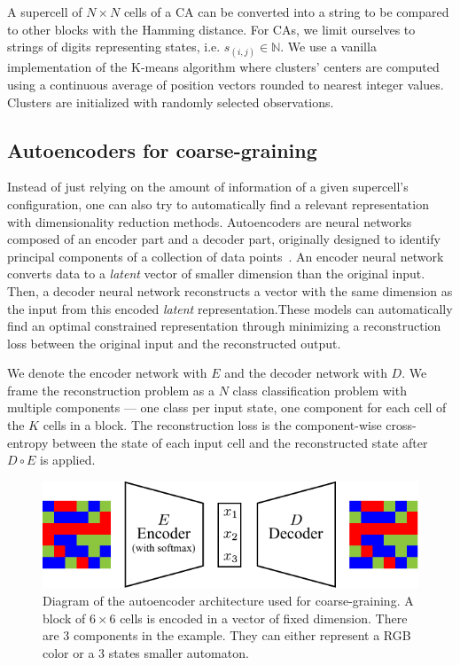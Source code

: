A supercell of $N\times N$ cells of a CA can be converted into a string to be
compared to other blocks with the Hamming distance. For CAs, we limit ourselves
to strings of digits representing states, i.e. $s_{(i,j)} \in \mathbb{N}$. We
use a vanilla implementation of the K-means algorithm where clusters' centers
are computed using a continuous average of position vectors rounded to nearest
integer values. Clusters are initialized with randomly selected observations.

\subsection{Autoencoders for coarse-graining}

Instead of just relying on the amount of information of a given supercell's
configuration, one can also try to automatically find a relevant representation
with dimensionality reduction methods. Autoencoders are neural networks composed
of an encoder part and a decoder part, originally designed to identify principal
components of a collection of data
points~\parencite{baldiNeuralNetworksPrincipal1989,
  hintonConnectionistLearningProcedures1989,
  kramerNonlinearPrincipalComponent1991}. An encoder neural network converts
data to a \emph{latent} vector of smaller dimension than the original input.
Then, a decoder neural network reconstructs a vector with the same dimension as
the input from this encoded \emph{latent} representation.These models can
automatically find an optimal constrained representation through minimizing a
reconstruction loss between the original input and the reconstructed output.

We denote the encoder network with $E$ and the decoder network with $D$. We frame
the reconstruction problem as a $N$ class classification problem with multiple
components --- one class per input state, one component for each cell of the $K$
cells in a block. The reconstruction loss is the component-wise cross-entropy
between the state of each input cell and the reconstructed state after $D \circ
E$ is applied.

\begin{figure}[th]
  \centering
  \includegraphics[width=.8\linewidth]{figures/autoencoder.pdf}
  \caption{\label{fig:autoencoder} Diagram of the autoencoder architecture used
    for coarse-graining. A block of $6\times 6$ cells is encoded in a vector of
    fixed dimension. There are 3 components in the example. They can either
    represent a RGB color or a 3 states smaller automaton.}
\end{figure}

